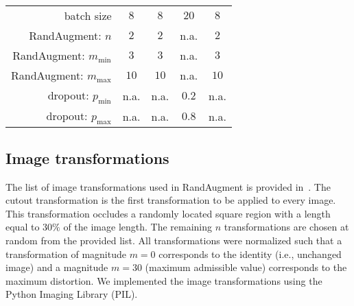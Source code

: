 \begin{table}
\begin{tabular}{r|cccc}
		batch size                          & $8$                   & $8$                   & $20$  & $8$                  \\ \hdashline[0.5pt/5pt]
		RandAugment: $n$                    & $2$                   & $2$                   & n.a. & $2$                   \\ \hdashline[0.5pt/5pt]
		RandAugment: $m_{\text{min}}$       & $3$                   & $3$                   & n.a. &  $3$                 \\ \hdashline[0.5pt/5pt]
		RandAugment: $m_{\text{max}}$       & $10$                  & $10$                  & n.a.  &  $10$                \\ \hdashline[0.5pt/5pt]
		dropout: $p_{\text{min}}$           & n.a.                  & n.a.                  & $0.2$  & n.a.                 \\ \hdashline[0.5pt/5pt]
		dropout: $p_{\text{max}}$           & n.a.                  & n.a.                  & $0.8$  & n.a.                
	\end{tabular}
\end{table}


\subsection{Image transformations}
\label{sec:img_transf}
The list of image transformations used in RandAugment is provided in~. The cutout transformation is the first transformation to be applied to every image. This transformation occludes a randomly located square region with a length equal to $30\%$ of the image length. The remaining $n$ transformations are chosen at random from the provided list. All transformations were normalized such that a transformation of magnitude $m = 0$ corresponds to the identity (i.e., unchanged image) and a magnitude $m = 30$ (maximum admissible value) corresponds to the maximum distortion. We implemented the image transformations using the Python Imaging Library (PIL).

